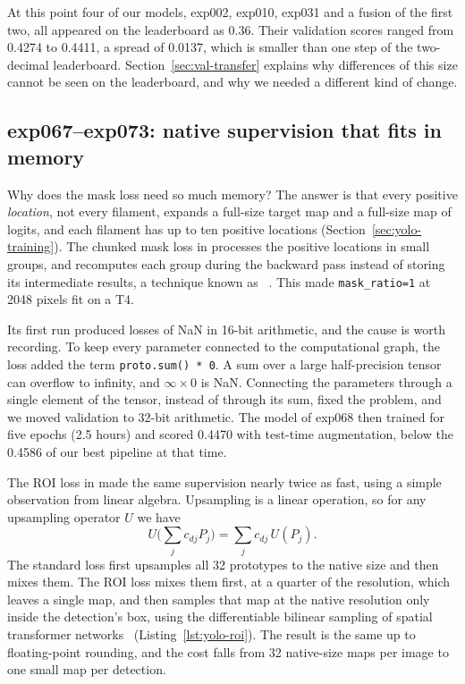 At this point four of our models, exp002, exp010, exp031 and a fusion of the first two, all appeared
on the leaderboard as 0.36. Their validation scores ranged from 0.4274 to 0.4411, a spread of 0.0137,
which is smaller than one step of the two-decimal leaderboard. Section~\ref{sec:val-transfer}
explains why differences of this size cannot be seen on the leaderboard, and why we needed a
different kind of change.

\subsection{exp067--exp073: native supervision that fits in memory}\label{sec:yolo-memory}
Why does the mask loss need so much memory? The answer is that every positive \emph{location}, not
every filament, expands a full-size target map and a full-size map of logits, and each filament has
up to ten positive locations (Section~\ref{sec:yolo-training}). The chunked mask loss in
 processes the positive locations in small groups, and recomputes
each group during the backward pass instead of storing its intermediate results, a technique known as
~\citep{checkpointing}. This made \texttt{mask\_ratio=1} at 2048 pixels fit on a T4.

Its first run produced losses of NaN in 16-bit arithmetic, and the cause is worth recording. To keep
every parameter connected to the computational graph, the loss added the term
\texttt{proto.sum() * 0}. A sum over a large half-precision tensor can overflow to infinity, and
$\infty\times0$ is NaN. Connecting the parameters through a single element of the tensor, instead of
through its sum, fixed the problem, and we moved validation to 32-bit arithmetic. The model of exp068
then trained for five epochs (2.5 hours) and scored 0.4470 with test-time augmentation, below the
0.4586 of our best pipeline at that time.

The ROI loss in  made the same supervision nearly twice as fast,
using a simple observation from linear algebra. Upsampling is a linear operation, so for any
upsampling operator $U$ we have
\begin{equation}
U\Big(\sum_{j} c_{dj} P_j\Big) = \sum_{j} c_{dj}\, U(P_j).
\end{equation}
The standard loss first upsamples all 32 prototypes to the native size and then mixes them. The ROI
loss mixes them first, at a quarter of the resolution, which leaves a single map, and then samples
that map at the native resolution only inside the detection's box, using the differentiable
bilinear sampling of spatial transformer networks~\citep{jaderberg2015}
(Listing~\ref{lst:yolo-roi}). The
result is the same up to floating-point rounding, and the cost falls from 32 native-size maps per
image to one small map per detection.

